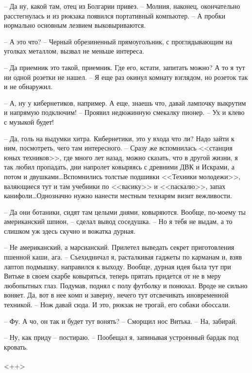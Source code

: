 \documentclass[a4paper]{book}
\begin{document}
-- Да ну, какой там, отец из Болгарии привез. -- Молния, наконец, окончательно расстегнулась и из рюкзака появился портативный компьютер. -- А пробки нормально основным лезвием выковыриваются.

-- А это что? -- Черный обрезиненный прямоугольник, с проглядывающим на уголках металлом, вызвал не меньше интереса. 

-- Да приемник это такой, приемник. Где его, кстати, запитать можно? А то я тут ни одной розетки не нашел. -- Я еще раз окинул комнату взглядом, но розеток так и не обнаружил.

-- А, ну у кибернетиков, например. А еще, знаешь что, давай лампочку выкрутим и напрямую подключим! -- Проявил недюжинную смекалку пионер. -- Ух и клево с музыкой будет! 

-- Да, голь на выдумки хитра. Кибернетики, это у входа что ли? Надо зайти к ним, посмотреть, чего там интересного. -- Сразу же вспомнилась <<станция юных техников>>, где много лет назад, можно сказать, что в другой жизни, я так любил пропадать, дни напролет ковыряясь с древними ДВК и Искрами, а потом и двушками\ldots Вспомнились толстые подшивки <<Техники молодежи>>, валяющиеся тут и там учебники по <<васику>> и <<паскалю>>, запах канифоли\ldots Однозначно нужно нанести местным технарям визит вежливости.

-- Да они ботаники, сидят там целыми днями, ковыряются. Вообще, по-моему ты американский шпион, -- сделал вывод соседушка. -- Но я тебя не выдам, а то слишком уж здесь скучно и вожатка дурная.

-- Не американский, а марсианский. Прилетел выведать секрет приготовления пшенной каши, ага. -- Съехидничал я, расталкивая гаджеты по карманам и, взяв лаптоп подмышку, направился к выходу. Вообще, дурная идея была тут при Витьке в своем скарбе ковыряться, теперь прятать придется от не в меру любопытных глаз. Подумав, поднял с полу футболку и понюхал. Вроде не сильно воняет. Да, вот в нее комп и заверну, нечего тут отсвечивать иновременной техникой. -- Нож давай сюда. И это, рюкзак не трогай, его собаки обоссали.

-- Фу. А чо, он так и будет тут вонять? -- Сморщил нос Витька. -- На, забирай.

-- Ну, как приду -- постираю. -- Пообещал я, запинывая устроенный бардак под кровать.

\paragraph{}<++>
\end{document}
